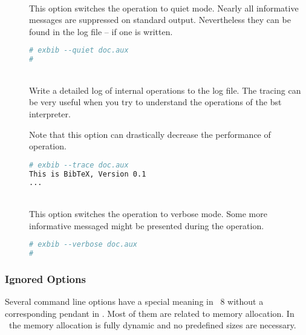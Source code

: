 \begin{description}
\item[]
\item[]
\item[]\ \\
  This option switches the operation to quiet mode. Nearly all
  informative messages are suppressed on standard output.
  Nevertheless they can be found in the log file -- if one is written.
\begin{lstlisting}[language=sh]
# exbib --quiet doc.aux
#
\end{lstlisting}

\item[]
\item[]\ \\
  Write a detailed log of internal operations to the log file.  The
  tracing can be very useful when you try to understand the operations
  of the bst interpreter.
  
  Note that this option can drastically decrease the performance of
  operation.
\begin{lstlisting}[language=sh]
# exbib --trace doc.aux
This is BibTeX, Version 0.1
...
\end{lstlisting}

\item[]
\item[]\ \\
  This option switches the operation to verbose mode. Some more
  informative messaged might be presented during the operation.
\begin{lstlisting}[language=sh]
# exbib --verbose doc.aux
#
\end{lstlisting}
\end{description}


\subsubsection{Ignored Options}

 Several command line options have a special meaning in
\BibTeX~8 without a corresponding pendant in \ExBib. Most of them are
related to memory allocation. In \ExBib\ the memory allocation is
fully dynamic and no predefined sizes are necessary.


